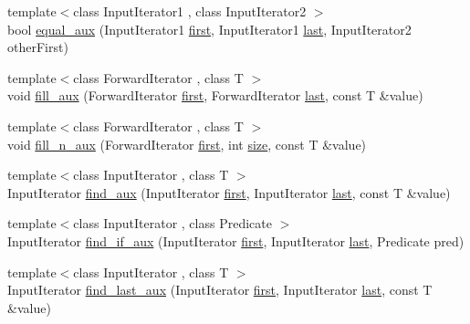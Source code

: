 \begin{DoxyCompactItemize}
\item 
{\footnotesize template$<$class Input\+Iterator1 , class Input\+Iterator2 $>$ }\\bool \hyperlink{namespaceprism_ac6dc9c68afaa8d8490148baf121bfc1c}{equal\+\_\+aux} (Input\+Iterator1 \hyperlink{namespaceprism_ae3fb7a1926a9e8e59300cd5e370470da}{first}, Input\+Iterator1 \hyperlink{namespaceprism_abe4956c4e865f55ca126b7fb973b5078}{last}, Input\+Iterator2 other\+First)
\item 
{\footnotesize template$<$class Forward\+Iterator , class T $>$ }\\void \hyperlink{namespaceprism_a76092b4faa3c2a98088678943ad23df4}{fill\+\_\+aux} (Forward\+Iterator \hyperlink{namespaceprism_ae3fb7a1926a9e8e59300cd5e370470da}{first}, Forward\+Iterator \hyperlink{namespaceprism_abe4956c4e865f55ca126b7fb973b5078}{last}, const T \&value)
\item 
{\footnotesize template$<$class Forward\+Iterator , class T $>$ }\\void \hyperlink{namespaceprism_ad2e7f5f7dee0072f4741520356ebdaee}{fill\+\_\+n\+\_\+aux} (Forward\+Iterator \hyperlink{namespaceprism_ae3fb7a1926a9e8e59300cd5e370470da}{first}, int \hyperlink{namespaceprism_acd3c0f96adf158a29387191d79c4d874}{size}, const T \&value)
\item 
{\footnotesize template$<$class Input\+Iterator , class T $>$ }\\Input\+Iterator \hyperlink{namespaceprism_af23b68308b7ec11222bd2bfb2904c595}{find\+\_\+aux} (Input\+Iterator \hyperlink{namespaceprism_ae3fb7a1926a9e8e59300cd5e370470da}{first}, Input\+Iterator \hyperlink{namespaceprism_abe4956c4e865f55ca126b7fb973b5078}{last}, const T \&value)
\item 
{\footnotesize template$<$class Input\+Iterator , class Predicate $>$ }\\Input\+Iterator \hyperlink{namespaceprism_a91c456a075b03cfe290044281af93203}{find\+\_\+if\+\_\+aux} (Input\+Iterator \hyperlink{namespaceprism_ae3fb7a1926a9e8e59300cd5e370470da}{first}, Input\+Iterator \hyperlink{namespaceprism_abe4956c4e865f55ca126b7fb973b5078}{last}, Predicate pred)
\item 
{\footnotesize template$<$class Input\+Iterator , class T $>$ }\\Input\+Iterator \hyperlink{namespaceprism_a66df70426cdeee37f0c06a90881f1f36}{find\+\_\+last\+\_\+aux} (Input\+Iterator \hyperlink{namespaceprism_ae3fb7a1926a9e8e59300cd5e370470da}{first}, Input\+Iterator \hyperlink{namespaceprism_abe4956c4e865f55ca126b7fb973b5078}{last}, const T \&value)

\end{DoxyCompactItemize}

